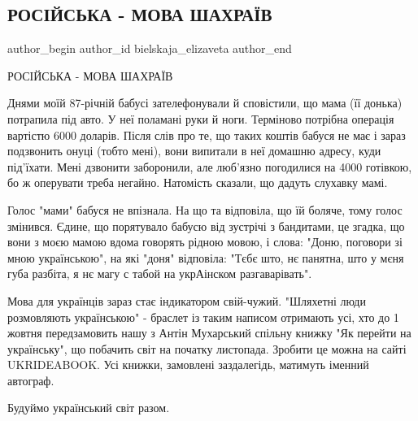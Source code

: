  
 
 
 
 
 
\subsection{РОСІЙСЬКА - МОВА ШАХРАЇВ}
\label{sec:09_09_2021.fb.bielskaja_elizaveta.1.jazyk_moshenniki}
 
\ifcmt
 author_begin
   author_id bielskaja_elizaveta
 author_end
\fi

РОСІЙСЬКА - МОВА ШАХРАЇВ 


Днями моїй 87-річній бабусі зателефонували й сповістили, що мама (її донька)
потрапила під авто. У неї поламані руки й ноги. Терміново потрібна операція
вартістю 6000 доларів. Після слів про те, що таких коштів бабуся не має і зараз
подзвонить онуці (тобто мені), вони випитали в неї домашню адресу, куди
під'їхати. Мені дзвонити заборонили, але люб'язно погодилися на 4000 готівкою,
бо ж оперувати треба негайно. Натомість сказали, що дадуть слухавку мамі. 

Голос "мами" бабуся не впізнала. На що та відповіла, що їй боляче, тому голос
змінився. Єдине, що порятувало бабусю від зустрічі з бандитами, це згадка, що
вони з моєю мамою вдома говорять рідною мовою, і слова: "Доню, поговори зі мною
українською", на які "доня" відповіла: "Тєбє што, нє панятна, што у мєня губа
разбіта, я нє магу с табой на укрАінском разгаварівать".

Мова для українців зараз стає індикатором свій-чужий. "Шляхетні люди
розмовляють українською" - браслет із таким написом отримають усі, хто до 1
жовтня передзамовить нашу з Антін Мухарський спільну книжку "Як перейти на
українську", що побачить світ на початку листопада. Зробити це можна на сайті
UKRIDEABOOK. Усі книжки, замовлені заздалегідь, матимуть іменний автограф.

Будуймо український світ разом.

